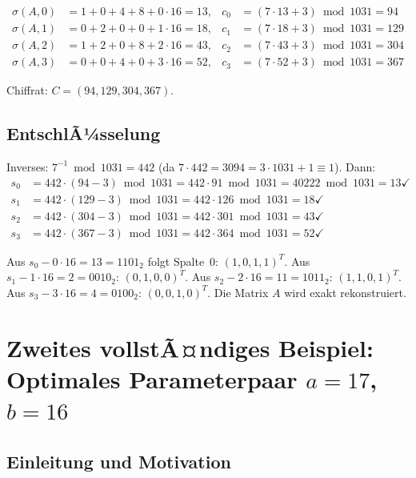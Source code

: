 ﻿\documentclass[a4paper,12pt]{scrreprt}
\theoremstyle{definition}
\begin{document}
\begin{align*}
	\sigma(A,0) &= 1{+}0{+}4{+}8 + 0 \cdot 16 = 13, & c_0 &= (7 \cdot 13 + 3) \bmod 1031 = 94 \\
	\sigma(A,1) &= 0{+}2{+}0{+}0 + 1 \cdot 16 = 18, & c_1 &= (7 \cdot 18 + 3) \bmod 1031 = 129 \\
	\sigma(A,2) &= 1{+}2{+}0{+}8 + 2 \cdot 16 = 43, & c_2 &= (7 \cdot 43 + 3) \bmod 1031 = 304 \\
	\sigma(A,3) &= 0{+}0{+}4{+}0 + 3 \cdot 16 = 52, & c_3 &= (7 \cdot 52 + 3) \bmod 1031 = 367
\end{align*}

Chiffrat: $C = (94, 129, 304, 367)$.

\subsection{EntschlÃ¼sselung}

Inverses: $7^{-1} \bmod 1031 = 442$ (da $7 \cdot 442 = 3094 = 3 \cdot 1031 + 1 \equiv 1$). Dann:
\begin{align*}
	s_0 &= 442 \cdot (94 - 3) \bmod 1031 = 442 \cdot 91 \bmod 1031 = 40222 \bmod 1031 = 13 \checkmark \\
	s_1 &= 442 \cdot (129 - 3) \bmod 1031 = 442 \cdot 126 \bmod 1031 = 18 \checkmark \\
	s_2 &= 442 \cdot (304 - 3) \bmod 1031 = 442 \cdot 301 \bmod 1031 = 43 \checkmark \\
	s_3 &= 442 \cdot (367 - 3) \bmod 1031 = 442 \cdot 364 \bmod 1031 = 52 \checkmark
\end{align*}

Aus $s_0 - 0 \cdot 16 = 13 = 1101_2$ folgt Spalte~0: $(1,0,1,1)^T$. Aus $s_1 - 1 \cdot 16 = 2 = 0010_2$: $(0,1,0,0)^T$. Aus $s_2 - 2 \cdot 16 = 11 = 1011_2$: $(1,1,0,1)^T$. Aus $s_3 - 3 \cdot 16 = 4 = 0100_2$: $(0,0,1,0)^T$. Die Matrix $A$ wird exakt rekonstruiert.

\section{Zweites vollstÃ¤ndiges Beispiel: Optimales Parameterpaar $a=17$, $b=16$}
\label{sec:beispiel2}

\subsection{Einleitung und Motivation}
\end{document}
